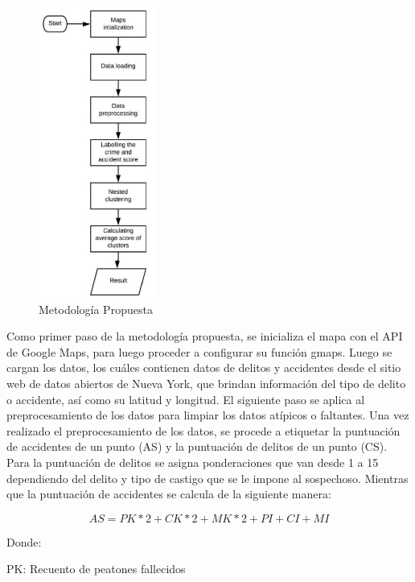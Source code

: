 \begin{figure}[h]
	\begin{center}
		\includegraphics[width=0.35\textwidth]{2/figures/routeMet.jpg}
		\caption{Metodología Propuesta}
		\label{1:fig2}
	\end{center}
\end{figure}
Como primer paso de la metodología propuesta, se inicializa el mapa con el API de Google Maps, para luego proceder a configurar su función gmaps. Luego se cargan los datos, los cuáles contienen datos de delitos y accidentes desde el sitio web de datos abiertos de Nueva York, que brindan información del tipo de delito o accidente, así como su latitud y longitud. El siguiente paso se aplica al preprocesamiento de los datos para limpiar los datos atípicos o faltantes.
Una vez realizado el preprocesamiento de los datos, se procede a etiquetar la puntuación de accidentes de un punto (AS) y la puntuación de delitos de un punto (CS). Para la puntuación de delitos se asigna ponderaciones que van desde 1 a 15 dependiendo del delito y tipo de castigo que se le impone al sospechoso. Mientras que la puntuación de accidentes se calcula de la siguiente manera:

\begin{equation} 
	AS = PK*2+CK*2+MK*2+PI+CI+MI
\end{equation}

	Donde:

PK: Recuento de peatones fallecidos

